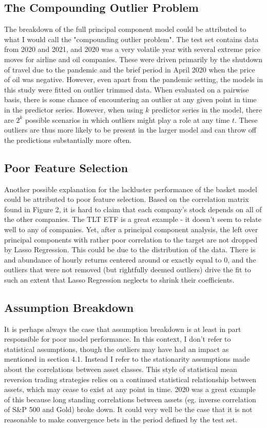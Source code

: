 \documentclass{article}
\begin{document}
\subsection{The Compounding Outlier Problem}
The breakdown of the full principal component model could
be attributed to what I would call the "compounding outlier problem". The test set contains
data from 2020 and 2021, and 2020 was a very volatile year with several extreme price 
moves for airline and oil companies. These were driven primarily by the shutdown 
of travel due to the pandemic and the brief period in April 2020 when the price of 
oil was negative. However, even apart from the pandemic setting, the models in this
study were fitted on outlier trimmed data. When evaluated on a pairwise basis,
there is some chance of encountering an outlier at any given point in time in the 
predictor series. However, when using $k$ predictor series in the model, there
are $2^k$ possible scenarios in which outliers might play a role at any time $t$. 
These outliers are thus more likely to be present in the larger model and can
throw off the predictions substantially more often. 

\subsection{Poor Feature Selection}
Another possible explanation for the lackluster performance of the basket model could
be attributed to poor feature selection. Based on the correlation matrix found 
in Figure 2, it is hard to claim that each company's stock depends on all of the 
other companies. The TLT ETF is a great example - it doesn't seem to relate well to 
any of companies. Yet, after a principal component analysis, the left over
principal components with rather poor correlation to the target are not dropped 
by Lasso Regression. This could be due to the distribution of the data. There is 
and abundance of hourly returns centered around or exactly equal to 0, and the outliers
that were not removed (but rightfully deemed outliers) drive the fit to such an 
extent that Lasso Regression neglects to shrink their coefficients.

\subsection{Assumption Breakdown}
It is perhaps always the case that assumption breakdown is at least in part responsible 
for poor model performance. In this context, I don't refer to statistical assumptions,
though the outliers may have had an impact as mentioned in section 4.1. Instead
I refer to the stationarity assumptions made about the correlations between
asset classes. This style of statistical mean reversion trading strategies relies
on a continued statistical relationship between assets, which may cease to exist at 
any point in time. 2020 was a great example of this because long standing correlations 
between assets (eg. inverse correlation of S\&P 500 and Gold) broke down. It could 
very well be the case that it is not reasonable to make convergence bets in the period
defined by the test set.
\end{document}
